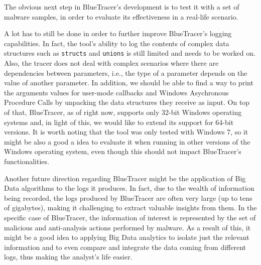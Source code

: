 The obvious next step in BlueTracer's development is to test it with a set of malware samples, in order to evaluate its effectiveness in a real-life scenario.

A lot has to still be done in order to further improve BlueTracer's logging capabilities. In fact, the tool's ability to log the contents of complex data structures such as \texttt{structs} and \texttt{unions} is still limited and needs to be worked on. Also, the tracer does not deal with complex scenarios where there are dependencies between parameters, i.e., the type of a parameter depends on the value of another parameter. In addition, we should be able to find a way to print the arguments values for user-mode callbacks and Windows Asychronous Procedure Calls by unpacking the data structures they receive as input. On top of that, BlueTracer, as of right now, supports only 32-bit Windows operating systems and, in light of this, we would like to extend its support for 64-bit versions. It is worth noting that the tool was only tested with Windows 7, so it might be also a good a idea to evaluate it when running in other versions of the Windows operating system, even though this should not impact BlueTracer's functionalities.

Another future direction regarding BlueTracer might be the application of Big Data algorithms to the logs it produces. In fact, due to the wealth of information being recorded, the logs produced by BlueTracer are often very large (up to tens of gigabytes), making it challenging to extract valuable insights from them. In the specific case of BlueTracer, the information of interest is represented by the set of malicious and anti-analysis actions performed by malware. As a result of this, it might be a good idea to applying Big Data analytics to isolate just the relevant information and to even compare and integrate the data coming from different logs, thus making the analyst's life easier.

\iffalse
Two areas:
\begin{enumerate}
\item Tools capabilities: support for struct, compatibility extension, more malwares tested
\item Data Analysis Techniques: data analysis for threat intelligence to analyze the logs.
\end{enumerate}
\fi